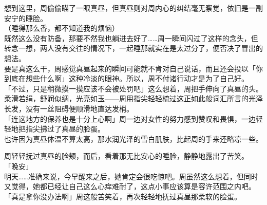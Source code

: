 想到这里，周偷偷瞄了一眼真昼，但真昼则对周内心的纠结毫无察觉，依旧是一副安宁的睡脸。\\%

（睡得那么香，都不知道我的烦恼）\\

既然这么没有防备，那要不然我也躺进去好了……周一瞬间闪过了这样的念头，但转念一想，两人没有交往的情况下，一起睡那就实在是太过分了，便否决了冒出的想法。\\

要是真这么干，周感觉真昼起来的瞬间可能就不肯对自己说话，而且还会投以「你到底在想些什么啊」这种冷淡的眼神。所以，周不付诸行动才是为了自己好。\\

「不过，只是稍微摸一摸应该不会被处罚吧」这么想着，周把手伸向了真昼的头。\\%

柔滑若绢，舒润似绸，光亮如玉——周用指尖轻轻梳过这正如此般词汇所言的光泽长发，没有一丝阻碍便顺滑地直达发梢。\\

「连这地方的保养也是十分上心啊」周一边对女性的努力感到赞叹和畏惧，一边轻轻地把指尖拂过了真昼的脸蛋。\\

也许因为真昼体温不算太高，那水润光泽的雪白肌肤，比起周的手来还略凉一些。

周轻轻抚过真昼的脸颊，而后，看着那无比安心的睡脸，静静地露出了苦笑。\\

「晚安」\\

明天……准确来说，今早醒来之后，她肯定会很吃惊吧。周虽然这么想着，但同时又觉得，她都已经让自己这么心痒难耐了，这点小事应该算是容许范围之内吧。\\

「真是拿你没办法啊」周这般苦笑着，再次轻轻地抚过真昼那柔软的脸蛋。
